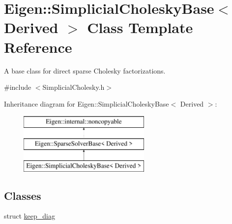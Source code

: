 \hypertarget{class_eigen_1_1_simplicial_cholesky_base}{}\section{Eigen\+::Simplicial\+Cholesky\+Base$<$ Derived $>$ Class Template Reference}
\label{class_eigen_1_1_simplicial_cholesky_base}


A base class for direct sparse Cholesky factorizations.  




{\ttfamily \#include $<$Simplicial\+Cholesky.\+h$>$}

Inheritance diagram for Eigen\+::Simplicial\+Cholesky\+Base$<$ Derived $>$\+:\begin{figure}[H]
\begin{center}
\leavevmode
\includegraphics[height=3.000000cm]{class_eigen_1_1_simplicial_cholesky_base}
\end{center}
\end{figure}
\subsection*{Classes}
\begin{DoxyCompactItemize}
\item 
struct \mbox{\hyperlink{struct_eigen_1_1_simplicial_cholesky_base_1_1keep__diag}{keep\+\_\+diag}}
\end{DoxyCompactItemize}
